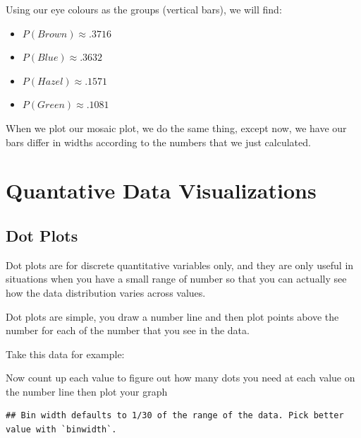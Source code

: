 \documentclass[
]{book}
\theoremstyle{definition}
\theoremstyle{definition}
\theoremstyle{definition}
\theoremstyle{definition}
\theoremstyle{remark}
\begin{document}
Using our eye colours as the groups (vertical bars), we will find:

\begin{itemize}
\item
  \(P(Brown) \approx .3716\)
\item
  \(P(Blue) \approx .3632\)
\item
  \(P(Hazel) \approx .1571\)
\item
  \(P(Green) \approx .1081\)
\end{itemize}

When we plot our mosaic plot, we do the same thing, except now, we have
our bars differ in widths according to the numbers that we just
calculated.

\hypertarget{quantative-data-visualizations}{%
\chapter{Quantative Data Visualizations}\label{quantative-data-visualizations}}

\hypertarget{dot-plots}{%
\section{Dot Plots}\label{dot-plots}}

Dot plots are for discrete quantitative variables only, and they are
only useful in situations when you have a small range of number so that
you can actually see how the data distribution varies across values.

Dot plots are simple, you draw a number line and then plot points above
the number for each of the number that you see in the data.

Take this data for example:

Now count up each value to figure out how many dots you need at each
value on the number line then plot your graph

\begin{verbatim}
## Bin width defaults to 1/30 of the range of the data. Pick better value with `binwidth`.
\end{verbatim}
\end{document}
